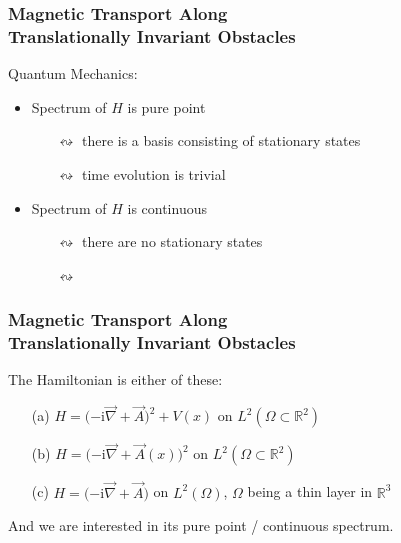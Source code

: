 \documentclass{beamer}
\renewcommand{\i}{\ensuremath{\mathrm i}}
\newcommand{\R}{\ensuremath{\mathbb R}}
\begin{document}
\begin{frame}
    \frametitle{Magnetic Transport \color{gray} Along \\ Translationally Invariant Obstacles}
    Quantum Mechanics: \\[15pt]
    \begin{itemize}
        \pause
        \item Spectrum of $H$ is pure point
        \begin{itemize}
            \pause
            \item[$\leftrightsquigarrow$] there is a basis consisting of stationary states
            \pause
            \item[$\leftrightsquigarrow$] time evolution is trivial \\[15pt]
        \end{itemize}
        \pause
        \item Spectrum of $H$ is continuous
        \begin{itemize}
            \pause
            \item[$\leftrightsquigarrow$] there are no stationary states
            \pause
            \item[$\leftrightsquigarrow$] 
        \end{itemize}
    \end{itemize}
    \vspace*{2cm}
\end{frame}

\begin{frame}
    \frametitle{Magnetic Transport Along \\ Translationally Invariant Obstacles}
    The Hamiltonian is either of these:
    \\[15pt]
    \begin{enumerate}
        \item[(a)] $H = \big({ -\i\vec\nabla + \vec A }\big)^2 + V(x)$ on $L^2(\Omega \subset \R^2)$
        \item[(b)] $H = \big({ -\i\vec\nabla + \vec A(x)}\big)^2$ on $L^2(\Omega \subset \R^2)$
        \item[(c)] $H = \big({ -\i\vec\nabla + \vec A})$ on $L^2(\Omega)$, $\Omega$ being a thin layer in $\R^3$
        \\[15pt]
    \end{enumerate}
    And we are interested in its pure point / continuous spectrum.
\end{frame}
\end{document}
